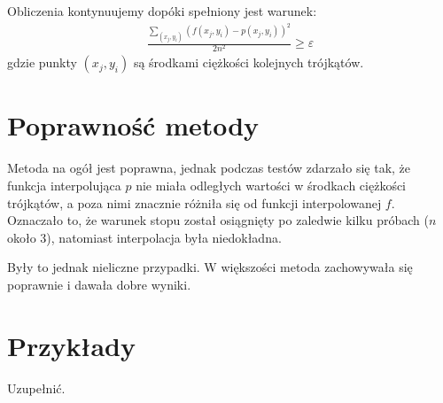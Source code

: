 \documentclass[12pt]{article}
\begin{document}
	Obliczenia kontynuujemy dopóki spełniony jest warunek:
	\begin{align*}
		\frac{\sum_{(x_j, y_i)} (f(x_j, y_i) - p(x_j, y_i))^2}{2n^2} \geq \varepsilon
	\end{align*}
	gdzie punkty $(x_j, y_i)$ są środkami ciężkości kolejnych trójkątów.
	
	\section{Poprawność metody}
	Metoda na ogół jest poprawna, jednak podczas testów zdarzało się tak, że funkcja interpolująca $p$ nie miała odległych wartości w środkach ciężkości trójkątów, a poza nimi znacznie różniła się od funkcji interpolowanej $f$. Oznaczało to, że warunek stopu został osiągnięty po zaledwie kilku próbach ($n$ około 3), natomiast interpolacja była niedokładna.
	
	Były to jednak nieliczne przypadki. W większości metoda zachowywała się poprawnie i dawała dobre wyniki.
	
	\section{Przykłady}
	Uzupełnić.
	
\end{document}
